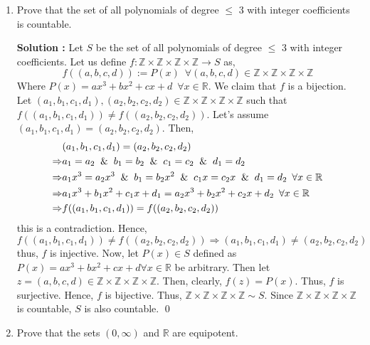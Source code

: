 \documentclass[10pt]{article}
\newcommand{\rn}{\mathbb{R}}
\newcommand{\q}{\mathbb{Q}}
\newcommand{\z}{\mathbb{Z}}
\begin{document}
\begin{enumerate}
    \textbf{Solution : }Let us define $f: \q \times \q \to F$ as, $$f((x, y)) := x + y\sqrt{2} \,\,\, \forall (x, y) \in \q \times \q$$ Now we claim that $f$ is a bijection. Let $(a_1, b_1), (a_2, b_2) \in \q \times \q$ such that $f((a_1, b_1)) = f((a_2, b_2))$. Then, 
    \begin{align*}
        f((a_1, b_1)) = f((a_2, b_2) )
        \Rightarrow &a_1 + b_1\sqrt{2} = a_2 + b_2\sqrt{2} \\
        \Rightarrow &(a_1 - a_2) = (b_2 - b_1)\sqrt{2} \\
        \Rightarrow &a_1 = a_2 \And b_1 = b_2 \tag{$\q$ is closed under addition} \\ 
        \Rightarrow &(a_1, b_1) = (a_2, b_2)
    \end{align*}
    Hence, $f$ is injective. Now, let $z \in F$ be arbitrary. Then, $z = p + q\sqrt{2}$ for some $p, q \in \q$. Then, $f((p,q)) = p + q\sqrt{2} = z$. Hence $f$ is onto. Thus, $f$ is bijective. Hence, $\q \times \q \sim F$. Since $\q \times \q$ is countable, $F$ is also countable. \qed
    \item Prove that the set of all polynomials of degree $\leq$ 3 with integer coefficients is countable.

    \textbf{Solution : } Let $S$ be the set of all polynomials of degree $\leq$ 3 with integer coefficients. Let us define $f : \z \times \z \times \z \times \z \to S$  as, $$f((a, b, c, d)) := P(x) \,\,\, \forall (a, b, c, d) \in \z \times \z \times \z \times \z$$ Where $P(x) = ax^3 + bx^2 + cx + d \,\,\, \forall x \in \rn$. We claim that $f$ is a bijection. Let $(a_1, b_1, c_1, d_1), (a_2, b_2, c_2, d_2) \in \z \times \z \times \z \times \z$ such that $f((a_1, b_1, c_1, d_1)) \neq f((a_2, b_2, c_2, d_2))$. Let's assume $(a_1, b_1, c_1, d_1) = (a_2, b_2, c_2, d_2)$. Then, 
    \begin{align*}
        &(a_1, b_1, c_1, d_1) = (a_2, b_2, c_2, d_2) \\
        \Rightarrow &a_1 = a_2 \And b_1 = b_2 \And c_1 = c_2 \And d_1 = d_2 \\
        \Rightarrow &a_1x^3 = a_2x^3 \And b_1 = b_2x^2 \And c_1x = c_2x \And d_1 = d_2 \,\,\, \forall x \in \rn\\
        \Rightarrow &a_1x^3 + b_1x^2 + c_1x + d_1 = a_2x^3 + b_2x^2 + c_2x + d_2 \,\,\, \forall x \in \rn \\
        \Rightarrow &f((a_1, b_1, c_1, d_1)) = f((a_2, b_2, c_2, d_2))
    \end{align*}
    this is a contradiction. Hence, $f((a_1, b_1, c_1, d_1)) \neq f((a_2, b_2, c_2, d_2)) \Rightarrow (a_1, b_1, c_1, d_1) \neq (a_2, b_2, c_2, d_2)$ thus, $f$ is injective. Now, let $P(x) \in S$ defined as  $P(x) = ax^3 + bx^2 + cx + d \forall x \in \rn$ be arbitrary. Then let $z = (a, b, c, d) \in \z \times \z \times \z \times \z$. Then, clearly, $f(z) = P(x)$. Thus, $f$ is surjective. Hence, $f$ is bijective. Thus, $\z \times \z \times \z \times \z \sim S$. Since $\z \times \z \times \z \times \z$ is countable, $S$ is also countable. \qed
    \item Prove that the sets $(0, \infty)$ and $\rn$ are equipotent.
    

\end{enumerate}
\end{document}

